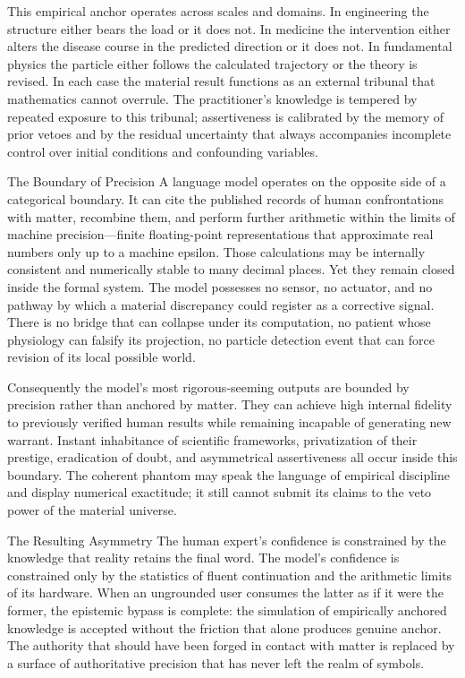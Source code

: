 This empirical anchor operates across scales and domains. In engineering the structure either bears the load or it does not. In medicine the intervention either alters the disease course in the predicted direction or it does not. In fundamental physics the particle either follows the calculated trajectory or the theory is revised. In each case the material result functions as an external tribunal that mathematics cannot overrule. The practitioner’s knowledge is tempered by repeated exposure to this tribunal; assertiveness is calibrated by the memory of prior vetoes and by the residual uncertainty that always accompanies incomplete control over initial conditions and confounding variables.

The Boundary of Precision
A language model operates on the opposite side of a categorical boundary. It can cite the published records of human confrontations with matter, recombine them, and perform further arithmetic within the limits of machine precision—finite floating-point representations that approximate real numbers only up to a machine epsilon. Those calculations may be internally consistent and numerically stable to many decimal places. Yet they remain closed inside the formal system. The model possesses no sensor, no actuator, and no pathway by which a material discrepancy could register as a corrective signal. There is no bridge that can collapse under its computation, no patient whose physiology can falsify its projection, no particle detection event that can force revision of its local possible world.

Consequently the model’s most rigorous-seeming outputs are bounded by precision rather than anchored by matter. They can achieve high internal fidelity to previously verified human results while remaining incapable of generating new warrant. Instant inhabitance of scientific frameworks, privatization of their prestige, eradication of doubt, and asymmetrical assertiveness all occur inside this boundary. The coherent phantom may speak the language of empirical discipline and display numerical exactitude; it still cannot submit its claims to the veto power of the material universe.

The Resulting Asymmetry
The human expert’s confidence is constrained by the knowledge that reality retains the final word. The model’s confidence is constrained only by the statistics of fluent continuation and the arithmetic limits of its hardware. When an ungrounded user consumes the latter as if it were the former, the epistemic bypass is complete: the simulation of empirically anchored knowledge is accepted without the friction that alone produces genuine anchor. The authority that should have been forged in contact with matter is replaced by a surface of authoritative precision that has never left the realm of symbols.

